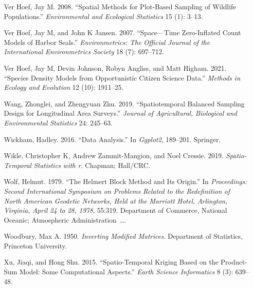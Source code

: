 \documentclass[smallextended]{svjour3}       %
\newlength{\cslhangindent}
\newlength{\cslentryspacingunit} %
\newenvironment{CSLReferences}[2] %
 {%
  \setlength{\parindent}{0pt}
  \ifodd #1
  \let\oldpar\par
  \def\par{\hangindent=\cslhangindent\oldpar}
  \fi
  \setlength{\parskip}{#2\cslentryspacingunit}
 }%
 {}
\begin{document}
\begin{CSLReferences}{1}{0}
\leavevmode{}%
Ver Hoef, Jay M. 2008. {``Spatial Methods for Plot-Based Sampling of
Wildlife Populations.''} \emph{Environmental and Ecological Statistics}
15 (1): 3--13.

\leavevmode{}%
Ver Hoef, Jay M, and John K Jansen. 2007. {``Space---Time Zero-Inflated
Count Models of Harbor Seals.''} \emph{Environmetrics: The Official
Journal of the International Environmetrics Society} 18 (7): 697--712.

\leavevmode{}%
Ver Hoef, Jay M, Devin Johnson, Robyn Angliss, and Matt Higham. 2021.
{``Species Density Models from Opportunistic Citizen Science Data.''}
\emph{Methods in Ecology and Evolution} 12 (10): 1911--25.

\leavevmode{}%
Wang, Zhonglei, and Zhengyuan Zhu. 2019. {``Spatiotemporal Balanced
Sampling Design for Longitudinal Area Surveys.''} \emph{Journal of
Agricultural, Biological and Environmental Statistics} 24: 245--63.

\leavevmode{}%
Wickham, Hadley. 2016. {``Data Analysis.''} In \emph{Ggplot2}, 189--201.
Springer.

\leavevmode{}%
Wikle, Christopher K, Andrew Zammit-Mangion, and Noel Cressie. 2019.
\emph{Spatio-Temporal Statistics with r}. Chapman; Hall/CRC.

\leavevmode{}%
Wolf, Helmut. 1979. {``The Helmert Block Method and Its Origin.''} In
\emph{Proceedings: Second International Symposium on Problems Related to
the Redefinition of North American Geodetic Networks, Held at the
Marriott Hotel, Arlington, Virginia, April 24 to 28, 1978}, 55:319.
Department of Commerce, National Oceanic; Atmospheric
Administration~\ldots.

\leavevmode{}%
Woodbury, Max A. 1950. \emph{Inverting Modified Matrices}. Department of
Statistics, Princeton University.

\leavevmode{}%
Xu, Jiaqi, and Hong Shu. 2015. {``Spatio-Temporal Kriging Based on the
Product-Sum Model: Some Computational Aspects.''} \emph{Earth Science
Informatics} 8 (3): 639--48.

\end{CSLReferences}




\end{document}
